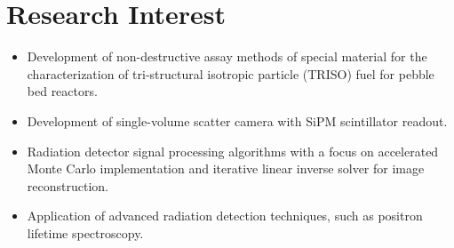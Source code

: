 \documentclass[letterpaper,11pt]{article} %
\newcommand{\CVItem}[1]{
  \item\small{
    {#1 \vspace{-2pt}}
  }
}
\newcommand{\CVItemListStart}{\begin{itemize}}
\newcommand{\CVItemListEnd}{\end{itemize}\vspace{-5pt}}
\begin{document}
\begin{comment}
try to briefly explain what you did and why it is relevant to the position you
are seeking
\end{comment}
\begin{comment}
Ideally the title of the work should speak for what it is. However if you feel
like you should explain more about why the project is applicable to this job,
use item list as is shown in the work experience section.
\end{comment}
\section{Research Interest}
  \CVItemListStart
    \CVItem{Development of non-destructive assay methods of special material for the characterization of tri-structural isotropic particle (TRISO) fuel for pebble bed reactors.}
    \CVItem{Development of single-volume scatter camera with SiPM scintillator readout.}
    \CVItem{Radiation detector signal processing algorithms with a focus on accelerated Monte Carlo implementation and iterative linear inverse solver for image reconstruction.}
    \CVItem{Application of advanced radiation detection techniques, such as positron lifetime spectroscopy.}
  \CVItemListEnd
\end{document}

